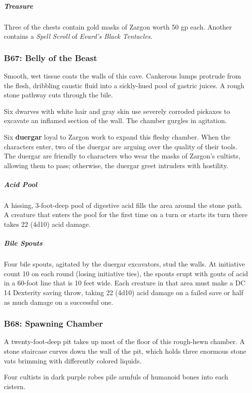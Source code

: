 \documentclass[10pt,a4paper,twoside,bg=print,twocolumn,openany,nodeprecatedcode]{dndbook}
\begin{document}
\subparagraph{Treasure}
Three of the chests contain gold masks of Zargon worth 50 gp each. Another contains a \textit{Spell Scroll} of \textit{Evard's Black Tentacles}.

\subsubsection{B67: Belly of the Beast}
\begin{DndReadAloud}{}
Smooth, wet tissue coats the walls of this cave. Cankerous lumps protrude from the flesh, dribbling caustic fluid into a sickly-hued pool of gastric juices. A rough stone pathway cuts through the bile.

Six dwarves with white hair and gray skin use severely corroded pickaxes to excavate an inflamed section of the wall. The chamber gurgles in agitation.

\end{DndReadAloud}

Six \textbf{duergar} loyal to Zargon work to expand this fleshy chamber. When the characters enter, two of the duergar are arguing over the quality of their tools. The duergar are friendly to characters who wear the masks of Zargon's cultists, allowing them to pass; otherwise, the duergar greet intruders with hostility.

\subparagraph{Acid Pool}
A hissing, 3-foot-deep pool of digestive acid fills the area around the stone path. A creature that enters the pool for the first time on a turn or starts its turn there takes 22 (4d10) acid damage.

\subparagraph{Bile Spouts}
Four bile spouts, agitated by the duergar excavators, stud the walls. At initiative count 10 on each round (losing initiative ties), the spouts erupt with gouts of acid in a 60-foot line that is 10 feet wide. Each creature in that area must make a DC 14 Dexterity saving throw, taking 22 (4d10) acid damage on a failed save or half as much damage on a successful one.

\subsubsection{B68: Spawning Chamber}
\begin{DndReadAloud}{}
A twenty-foot-deep pit takes up most of the floor of this rough-hewn chamber. A stone staircase curves down the wall of the pit, which holds three enormous stone vats brimming with differently colored liquids.

Four cultists in dark purple robes pile armfuls of humanoid bones into each cistern.

\end{DndReadAloud}
\end{document}
